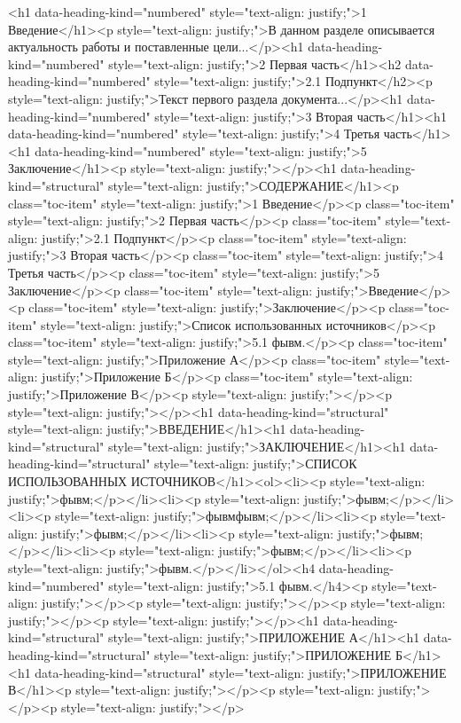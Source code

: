 \documentclass[paper=a4, fontsize=14pt, pagesize, DIV=calc, oneside]{scrreport}
\begin{document}
\pagestyle{empty} 



\newpage
\tableofcontents
\newpage

\pagestyle{plain}
\setcounter{page}{2} 

<h1 data-heading-kind="numbered" style="text-align: justify;">1 Введение</h1><p style="text-align: justify;">В данном разделе описывается актуальность работы и поставленные цели...</p><h1 data-heading-kind="numbered" style="text-align: justify;">2 Первая часть</h1><h2 data-heading-kind="numbered" style="text-align: justify;">2.1 Подпункт</h2><p style="text-align: justify;">Текст первого раздела документа...</p><h1 data-heading-kind="numbered" style="text-align: justify;">3 Вторая часть</h1><h1 data-heading-kind="numbered" style="text-align: justify;">4 Третья часть</h1><h1 data-heading-kind="numbered" style="text-align: justify;">5 Заключение</h1><p style="text-align: justify;"></p><h1 data-heading-kind="structural" style="text-align: justify;">СОДЕРЖАНИЕ</h1><p class="toc-item" style="text-align: justify;">1 Введение</p><p class="toc-item" style="text-align: justify;">2 Первая часть</p><p class="toc-item" style="text-align: justify;">2.1 Подпункт</p><p class="toc-item" style="text-align: justify;">3 Вторая часть</p><p class="toc-item" style="text-align: justify;">4 Третья часть</p><p class="toc-item" style="text-align: justify;">5 Заключение</p><p class="toc-item" style="text-align: justify;">Введение</p><p class="toc-item" style="text-align: justify;">Заключение</p><p class="toc-item" style="text-align: justify;">Список использованных источников</p><p class="toc-item" style="text-align: justify;">5.1 фывм.</p><p class="toc-item" style="text-align: justify;">Приложение А</p><p class="toc-item" style="text-align: justify;">Приложение Б</p><p class="toc-item" style="text-align: justify;">Приложение В</p><p style="text-align: justify;"></p><p style="text-align: justify;"></p><h1 data-heading-kind="structural" style="text-align: justify;">ВВЕДЕНИЕ</h1><h1 data-heading-kind="structural" style="text-align: justify;">ЗАКЛЮЧЕНИЕ</h1><h1 data-heading-kind="structural" style="text-align: justify;">СПИСОК ИСПОЛЬЗОВАННЫХ ИСТОЧНИКОВ</h1><ol><li><p style="text-align: justify;">фывм;</p></li><li><p style="text-align: justify;">фывм;</p></li><li><p style="text-align: justify;">фывмфывм;</p></li><li><p style="text-align: justify;">фывм;</p></li><li><p style="text-align: justify;">фывм;</p></li><li><p style="text-align: justify;">фывм;</p></li><li><p style="text-align: justify;">фывм.</p></li></ol><h4 data-heading-kind="numbered" style="text-align: justify;">5.1 фывм.</h4><p style="text-align: justify;"></p><p style="text-align: justify;"></p><p style="text-align: justify;"></p><p style="text-align: justify;"></p><h1 data-heading-kind="structural" style="text-align: justify;">ПРИЛОЖЕНИЕ А</h1><h1 data-heading-kind="structural" style="text-align: justify;">ПРИЛОЖЕНИЕ Б</h1><h1 data-heading-kind="structural" style="text-align: justify;">ПРИЛОЖЕНИЕ В</h1><p style="text-align: justify;"></p><p style="text-align: justify;"></p><p style="text-align: justify;"></p>

\newpage
\printbibliography[heading=bibintoc, title={Список использованных источников}]
\end{document}
